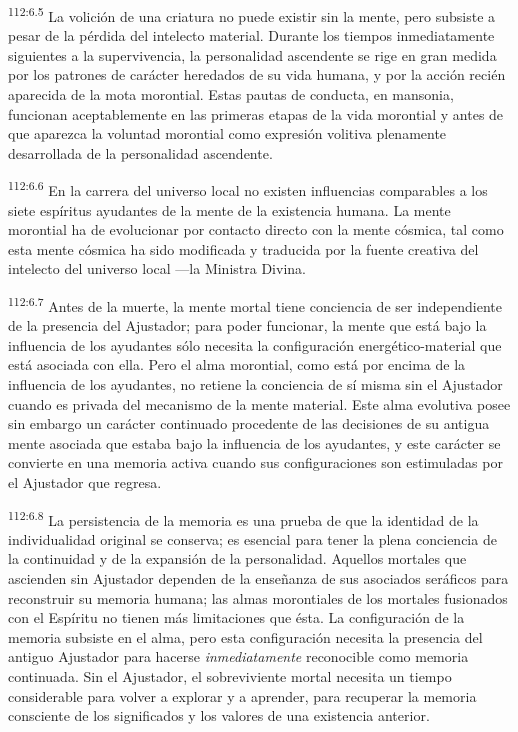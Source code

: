 \par
\textsuperscript{112:6.5} La volición de una criatura no puede existir sin la mente, pero subsiste a pesar de la pérdida del intelecto material. Durante los tiempos inmediatamente siguientes a la supervivencia, la personalidad ascendente se rige en gran medida por los patrones de carácter heredados de su vida humana, y por la acción recién aparecida de la mota morontial. Estas pautas de conducta, en mansonia, funcionan aceptablemente en las primeras etapas de la vida morontial y antes de que aparezca la voluntad morontial como expresión volitiva plenamente desarrollada de la personalidad ascendente.

\par
\textsuperscript{112:6.6} En la carrera del universo local no existen influencias comparables a los siete espíritus ayudantes de la mente de la existencia humana. La mente morontial ha de evolucionar por contacto directo con la mente cósmica, tal como esta mente cósmica ha sido modificada y traducida por la fuente creativa del intelecto del universo local ---la Ministra Divina.

\par
\textsuperscript{112:6.7} Antes de la muerte, la mente mortal tiene conciencia de ser independiente de la presencia del Ajustador; para poder funcionar, la mente que está bajo la influencia de los ayudantes sólo necesita la configuración energético-material que está asociada con ella. Pero el alma morontial, como está por encima de la influencia de los ayudantes, no retiene la conciencia de sí misma sin el Ajustador cuando es privada del mecanismo de la mente material. Este alma evolutiva posee sin embargo un carácter continuado procedente de las decisiones de su antigua mente asociada que estaba bajo la influencia de los ayudantes, y este carácter se convierte en una memoria activa cuando sus configuraciones son estimuladas por el Ajustador que regresa.

\par
\textsuperscript{112:6.8} La persistencia de la memoria es una prueba de que la identidad de la individualidad original se conserva; es esencial para tener la plena conciencia de la continuidad y de la expansión de la personalidad. Aquellos mortales que ascienden sin Ajustador dependen de la enseñanza de sus asociados seráficos para reconstruir su memoria humana; las almas morontiales de los mortales fusionados con el Espíritu no tienen más limitaciones que ésta. La configuración de la memoria subsiste en el alma, pero esta configuración necesita la presencia del antiguo Ajustador para hacerse \textit{inmediatamente} reconocible como memoria continuada. Sin el Ajustador, el sobreviviente mortal necesita un tiempo considerable para volver a explorar y a aprender, para recuperar la memoria consciente de los significados y los valores de una existencia anterior.

